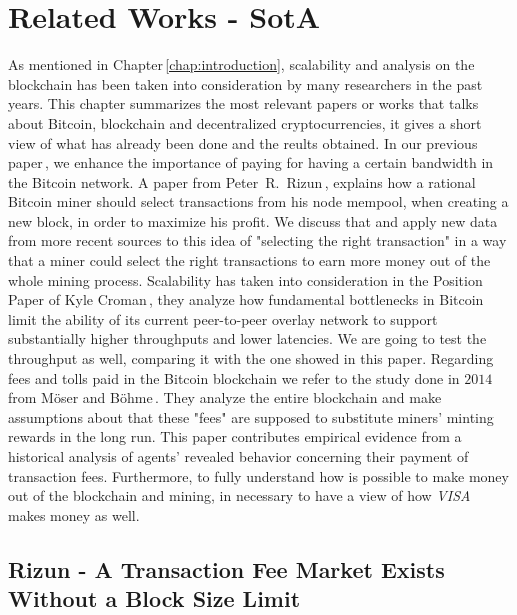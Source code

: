 \documentclass[USenglish]{uit-thesis}
\begin{document}
\chapter{Related Works - SotA}
\label{chap:prev_works}
As mentioned in Chapter\,\ref{chap:introduction},
scalability and analysis on the blockchain has been taken into consideration
by many researchers in the past years.
This chapter summarizes the most relevant papers or
works that talks about Bitcoin,
blockchain and decentralized cryptocurrencies,
it gives a short view of what has already been done and
the reults obtained.
In our previous paper\,\cite{Tedeschi:2016:PBB}, we enhance
the importance of paying for having a certain
bandwidth in the Bitcoin network.
A paper
from Peter~R.~Rizun\,\cite{Rizun:2015:blocksizelimit},
explains how a rational Bitcoin
miner should select transactions from his node mempool,
when creating a new block,
in order to maximize his profit. We discuss that and apply
new data from more recent sources to this idea of
"selecting the right transaction" in a way that a miner could
select the right transactions to earn more money out of the whole
mining process.
Scalability has taken into consideration
in the Position Paper of Kyle Croman\,\cite{croman2016}, they
analyze how fundamental bottlenecks in Bitcoin limit the ability
of its current peer-to-peer
overlay network to support substantially higher
throughputs and lower latencies. We are
going to test the throughput as well, comparing it with the one
showed in this paper.
Regarding fees and tolls paid in the Bitcoin blockchain
we refer to the study done in $2014$ from Möser and
Böhme\,\cite{Moser2015}. They analyze the
entire blockchain and make assumptions about
that these "fees" are supposed to substitute miners'
minting rewards in the long run. This paper
contributes empirical evidence from a historical
analysis of agents' revealed behavior concerning
their payment of transaction fees.
Furthermore, to fully understand how is possible
to make money out of the blockchain and mining,
in necessary to have a view of
how \emph{VISA}\,\cite{visa} makes money as well.

\section{Rizun - A Transaction Fee Market Exists Without a Block Size Limit\,\cite{Rizun:2015:blocksizelimit}}
\label{sec:rizun}
\end{document}
